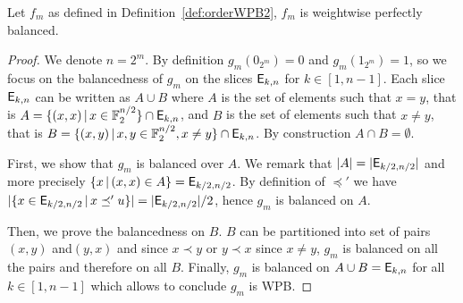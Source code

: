 \documentclass[11pt]{llncs}
\begin{document}
\begin{theorem}\label{thm:orderWPB2}
	
	Let $f_m$ as defined in Definition~\ref{def:orderWPB2}, $f_m$ is weightwise perfectly balanced.
	
\end{theorem}
\begin{proof}
We denote $n=2^m$. 
By definition $g_m(0_{2^m})=0$ and $g_m(1_{2^m})=1$, so we focus on the balancedness of $g_m$ on the slices $\mathsf{E}_{k,n}$ for $k\in [1,n-1]$. Each slice $\mathsf{E}_{k,n}$ can be written as $A \cup B$ where $A$ is the set of elements such that $x=y$, that is $A=\{(x,x) \, | \, x \in \mathbb{F}_2^{n/2} \} \cap \mathsf{E}_{k,n}$, and $B$ is the set of elements such that $x\ne y$, that is $B=\{(x,y) \, | \, x,y \in \mathbb{F}_2^{n/2}, x \ne y \}\cap \mathsf{E}_{k,n}$. 
By construction $A \cap B =\emptyset$. 

First, we show that $g_m$ is balanced over $A$. 
We remark that $|A|=|\mathsf{E}_{k/2,n/2}|$ and more precisely $\{x\, | \, (x,x) \in A\}=\mathsf{E}_{k/2,n/2}$. 
By definition of $\preceq'$ we have $|\{x \in \mathsf{E}_{k/2,n/2}\, | \, x \preceq' u\}|= |\mathsf{E}_{k/2,n/2}|/2$, hence $g_m$ is balanced on $A$.

Then, we prove the balancedness on $B$. $B$ can be partitioned into set of pairs $(x,y)$ and$ (y,x)$ and since $x \prec y$ or $y \prec x$ since $x\ne y$, $g_m$ is balanced on all the pairs and therefore on all $B$. 
Finally, $g_m$ is balanced on $A \cup B =\mathsf{E}_{k,n}$ for all $k\in [1,n-1]$ which allows to conclude $g_m$ is WPB.

		
\end{proof}
\end{document}
